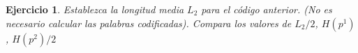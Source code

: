 \documentclass{beamer}
\theoremstyle{plain}
\theoremstyle{example}
\newtheorem{ejercicio} [Ejercicio]{Ejercicio}
\theoremstyle{example}
\begin{document}
\begin{frame}  \footnotesize
\begin{ejercicio}
Establezca la longitud media $L_2$ para el código anterior. (No es necesario calcular las palabras codificadas). Compara los valores de $L_2/2$, $H(p^1)$, $H(p^2)/2$
\end{ejercicio}
\end{frame} 
\end{document}
